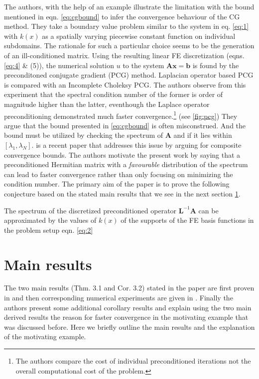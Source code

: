 The authors, with the help of an example \parencite[Ref.][Section 2, An Example]{gergelits2019laplacian} illustrate the limitation with the bound mentioned in eqn. \eqref{eq:cgbound} to infer the convergence behaviour of the CG method. They take a boundary value problem similar to the system in eq. \eqref{eq:1} with $k(x)$ as a spatially varying piecewise constant function on individual subdomains. The rationale for such a particular choice seems to be the generation of an ill-conditioned matrix. Using the resulting linear FE discretization (eqns. \eqref{eq:4} \& (5)), the numerical solution $u$ to the system $\mathbf{Ax=b}$ is found by the preconditoned conjugate gradient (PCG) method. Laplacian operator based PCG is compared with an Incomplete Choleksy PCG. The authors observe from this experiment that the spectral condition number of the former is order of magnitude higher than the latter, eventhough the Laplace operator preconditioning demonstrated much faster convergence.\footnote{The authors compare the cost of individual preconditioned iterations not the overall computational cost of the problem.} (see \ref{fig:pcg}) They argue that the bound presented in \eqref{eq:cgbound} is often misconstrued. And the bound must be utilized by checking the spectrum of $\mathbf{A}$ and if it lies within $[\lambda_{1},\lambda_{N}]$. \cite{gergelits2014composite} is a recent paper that addresses this issue by arguing for composite convergence bounds. The authors motivate the present work by saying that a preconditioned Hermitian matrix with a \emph{favourable} distribution of the spectrum can lead to faster convergence rather than only focusing on minimizing the condition number. The primary aim of the paper is to prove the following conjecture based on the stated main results that we see in the next section \ref{sec:results}.

\begin{conjecture}
  \label{con:1}
  The spectrum of the discretized preconditioned operator $\mathbf{L}^{-1}\mathbf{A}$ can be approximated by the values of $k(x)$ of the supports of the FE basis functions in the problem setup eqn. \eqref{eq:2}
\end{conjecture}

\section{Main results}
\label{sec:results}
The two main results (Thm. 3.1 and Cor. 3.2) stated in the paper are first proven in \cite[][Section 3, Analysis]{gergelits2019laplacian} and then corresponding numerical experiments are given in \cite[][Section 4.1, Illust.]{gergelits2019laplacian}. Finally the authors present some additional corollary results and explain using the two main derived results the reason for faster convergence in the motivating example that was discussed before. Here we briefly outline the main results and the explanation of the motivating example.

